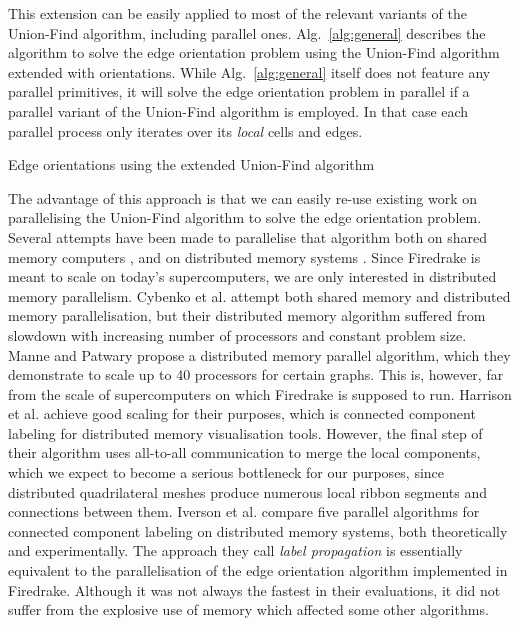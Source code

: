 \documentclass[oneeqnum,onethmnum,onefignum,onetabnum]{siamltex1213}
\begin{document}
This extension can be easily applied to most of the relevant variants
of the Union-Find algorithm, including parallel ones.
Alg.~\ref{alg:general} describes the algorithm to solve the edge
orientation problem using the Union-Find algorithm extended with
orientations. While Alg.~\ref{alg:general} itself does not feature any
parallel primitives, it will solve the edge orientation problem in
parallel if a parallel variant of the Union-Find algorithm
is employed. In that case each parallel process only iterates over its
\emph{local} cells and edges.

\begin{algorithm}
  \caption{Edge orientations using the extended Union-Find algorithm}
  \label{alg:general}
  \begin{algorithmic}[1]
    \ForAll {}
      \State 
      \State 
      \State 
      \State {}
      \State {}
    \EndFor
    \ForAll {}
      \State  {}
      \State 
    \EndFor
  \end{algorithmic}
\end{algorithm}

The advantage of this approach is that we can easily re-use existing
work on parallelising the Union-Find algorithm to solve the edge
orientation problem.
Several attempts have been made to parallelise that algorithm both
on shared memory computers \cite{Cybenko1988, Anderson1991, Bader2005,
  Patwary2012}, and on distributed memory systems \cite{Cybenko1988,
  Manne2010, Harrison2011, Iverson2015}.
Since Firedrake is meant to scale on today's supercomputers, we are
only interested in distributed memory parallelism.
Cybenko et al.\@ \cite{Cybenko1988} attempt both shared memory and
distributed memory parallelisation, but their distributed memory
algorithm suffered from slowdown with increasing number of processors
and constant problem size.
Manne and Patwary \cite{Manne2010} propose a distributed memory
parallel algorithm, which they demonstrate to scale up to 40
processors for certain graphs. This is, however, far from the scale
of supercomputers on which Firedrake is supposed to run.
Harrison et al.\@ \cite{Harrison2011} achieve good scaling for their
purposes, which is connected component labeling for distributed
memory visualisation tools. However, the final step of their algorithm
uses all-to-all communication to merge the local components, which we
expect to become a serious bottleneck for our purposes, since
distributed quadrilateral meshes produce numerous local ribbon
segments and connections between them.
Iverson et al.\@ \cite{Iverson2015} compare five parallel algorithms
for connected component labeling on distributed memory systems, both
theoretically and experimentally. The approach they call \emph{label
  propagation} is essentially equivalent to the parallelisation of
the edge orientation algorithm implemented in Firedrake.
Although it was not always the fastest in their evaluations,
it did not suffer from the explosive use of memory which affected some
other algorithms.
\end{document}
